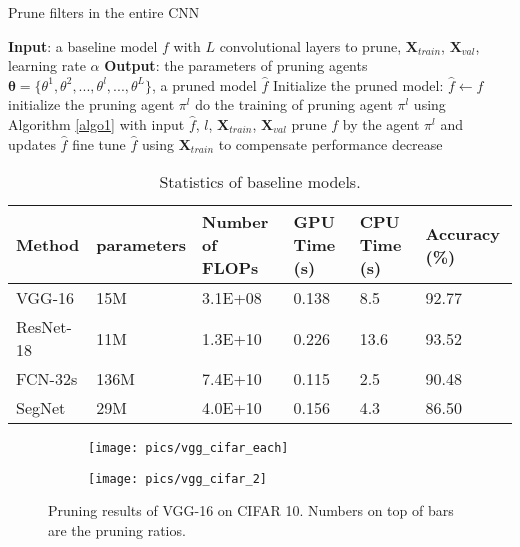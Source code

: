 \documentclass[10pt,twocolumn,letterpaper]{article}
\begin{document}
\begin{algorithm}[!ht]
  \caption{Prune filters in the entire CNN}\label{algo2}
  \begin{algorithmic}
    
  \State \textbf{Input}: a baseline model $f$ with $L$ convolutional layers to prune, $\mathbf{X}_{train}$, $\mathbf{X}_{val}$, learning rate $\alpha$
  \State \textbf{Output}: the parameters of pruning agents $\boldsymbol{\theta} = \{ \theta^1, \theta^2, ..., \theta^l, ..., \theta^L   \}$, a pruned model $\hat{f}$
  \State Initialize the pruned model: $\hat{f} \leftarrow f$ 
      \State initialize the pruning agent $\pi^l$
      \State do the training of pruning agent $\pi^l$ using Algorithm \ref{algo1} with input $\hat{f}$, $l$, $\mathbf{X}_{train}$, $\mathbf{X}_{val}$
      \State prune $f$ by the agent $\pi^l$ and updates $\hat{f}$
      \State fine tune $\hat{f}$ using $\mathbf{X}_{train}$ to compensate performance decrease
  \EndFor   
  \end{algorithmic}
\end{algorithm}


\begin{table*}
  \caption{Statistics of baseline models.}
  \label{tl:baseline}
  \centering
  \begin{tabular}{llllll}
    \toprule

    Method     		   & parameters   & Number of FLOPs   & GPU Time (s) & CPU Time (s)  & Accuracy (\%) \\
    \midrule
    
    VGG-16 	   &  15M	& 3.1E+08 & 0.138  &8.5 & 92.77  \\
    ResNet-18 	   &  11M & 1.3E+10 & 0.226	&13.6& 93.52	\\
    FCN-32s	   & 136M  & 7.4E+10 & 0.115	&  2.5  & 90.48 		\\
    SegNet 	   &  	29M & 4.0E+10 & 0.156	& 4.3 & 	86.50	\\    

    \bottomrule
  \end{tabular}

\end{table*}





\begin{figure*}[h]
  \centering
  \captionsetup{justification=centering}
  \begin{subfigure}{.5\textwidth}
  \centering
  \texttt{[image: pics/vgg\_cifar\_each]}
  \label{fig:vgg_cifar_in}
\end{subfigure}%
\hfill
\begin{subfigure}{.5\textwidth}
  \centering
  \texttt{[image: pics/vgg\_cifar\_2]}
  \label{fig:vgg_cifar_all}
\end{subfigure}%
\caption{ Pruning results of VGG-16 on CIFAR 10. Numbers on top of bars are the pruning ratios.}
\label{fig:vgg_cifar}
\end{figure*}
\end{document}

